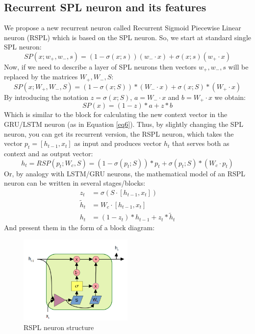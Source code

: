 \documentclass[sn-apa]{sn-jnl}%
\begin{document}
\subsection{Recurrent SPL neuron and its features}\label{subsec53}
We propose a new recurrent neuron called Recurrent Sigmoid Piecewise Linear neuron (RSPL) which is based on the SPL neuron. So, we start at standard single SPL neuron:
\begin{equation}
SP(x;w_+,w_-,s) = (1 - \sigma(x;s))(w_- \cdot x) + \sigma(x;s)(w_+ \cdot x) \label{eq18}
\end{equation}
Now, if we need to describe a layer of SPL neurons then vectors $w_+,w_-,s$ will be replaced by the matrices  $W_+,W_-,S$:
\begin{equation}
SP(x;W_+,W_-, S) = (1 - \sigma(x;S)) * (W_- \cdot x) + \sigma(x;S) * (W_+ \cdot x) \label{eq19}
\end{equation}
By introducing the notation $ z = \sigma(x;S) $, $a = W_- \cdot x$  and $b = W_+ \cdot x$ we obtain:
\begin{equation}
SP(x) = (1 - z) * a + z * b \label{eq20}
\end{equation}
Which is similar to the block for calculating the new context vector in the GRU/LSTM neuron (as in Equation \ref{eq6}). Thus, by slightly changing the SPL neuron, you can get its recurrent version, the RSPL neuron, which takes the vector $p_t=[h_{t-1}, x_t]$ as input and produces vector $h_t$ that serves both as context and as output vector:
\begin{equation}
h_t=RSP(p_t;W_c,S) = (1-\sigma(p_t;S))*p_t + \sigma(p_t;S)*(W_c \cdot p_t) \label{eq21}
\end{equation}
Or, by analogy with LSTM/GRU neurons, the mathematical model of an RSPL neuron can be written in several stages/blocks:
\begin{align}
z_t &= \sigma(S \cdot [h_{t-1}, x_t]) \nonumber \\
\tilde{h}_t &= W_c \cdot [h_{t-1}, x_t] \nonumber \\
h_t &= (1 - z_t) * h_{t-1} + z_t * \tilde{h}_t \label{eq22}
\end{align}
And present them in the form of a block diagram:

\begin{figure}[H]
\centering
\includegraphics[width=0.5\textwidth]{recurrent_sigmoid_piecewise_neuron_structure.png}
\caption{RSPL neuron structure}\label{fig7}
\end{figure}
\end{document}

